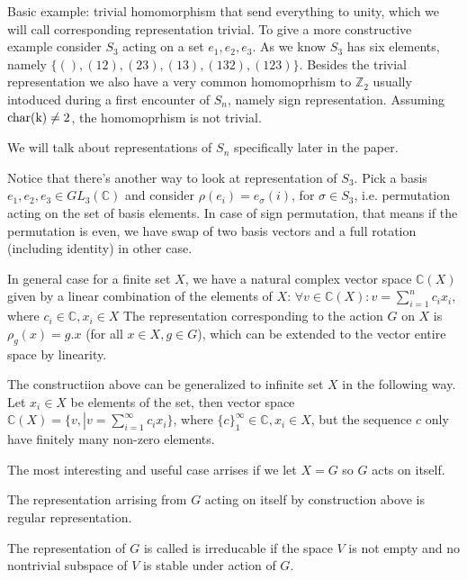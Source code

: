 \documentclass{amsart}
\def\char{\rm char}
\begin{document}
Basic example:  trivial homomorphism that send everything to unity, which we will call corresponding representation trivial. 
To give a more constructive example consider $S_3$ acting on a set $e_1, e_2, e_3$.
As we know $S_3$ has six elements, namely $\{ (), (12), (23), (13), (132), (123) \}$. 
Besides the trivial representation we also have a very common homomoprhism to $\mathbb{Z}_2$ usually intoduced during a first encounter of $S_n$, namely sign representation.
Assuming $\char(k) \neq 2$, the homomoprhism is not trivial. 


We will talk about representations of $S_n$ specifically later in the paper.

Notice that there's another way to look at representation of $S_3$. Pick a basis $e_1, e_2, e_3 \in GL_3 (\mathbb C)$ and consider $\rho (e_i) = e_\sigma(i)$, for $\sigma \in S_3$, i.e. permutation acting on the set of basis elements. In case of sign permutation, that means 
if the permutation is even, we have swap of two basis vectors and a full rotation (including identity) in other case.

In general case for a finite set $X$, we have a natural complex vector space $\mathbb{C}(X)$ given by a linear combination of the elements of $X$:
$\forall v \in \mathbb{C}(X): v = \sum_{i=1}^n c_i x_i$, where $c_i \in \mathbb{C}, x_i \in X$
The representation corresponding to the action $G$ on $X$ is $\rho_g (x) = g . x$ (for all $x\in X, g \in G$), which can be extended to the vector entire space by linearity.

\begin{note}
    The constructiion above can be generalized to infinite set $X$ in the following way.
    Let $x_i \in X$ be elements of the set, 
    then vector space $\mathbb{C}(X)=\{ v, \left. \right| v = \sum_{i=1}^\infty c_i x_i\}$, where $ \{c\}_1^\infty \in \mathbb{C}, x_i \in X$, 
    but the sequence $c$ only have finitely many non-zero elements.
\end{note}

The most interesting and useful case arrises if we let $X = G$ so $G$ acts on itself.

\begin{definition}
The representation arrising from $G$ acting on itself by construction above is regular representation.
\end{definition}

\begin{definition}

The representation of $G$ is called is irreducable if the space $V$ is not empty and no nontrivial subspace of $V$ is stable under action of $G$.
    
\end{definition}
\end{document}
